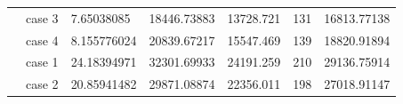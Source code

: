 \begin{table}[]
\begin{tabular}{cllllll}
    \rowcolor[HTML]{FFFFC7} 
    \cellcolor[HTML]{FFFFC7}                                                                                               & case 3                  & 7.65038085                                                                             & 18446.73883                                                                               & 13728.721                                                                           & 131                                                                        & 16813.77138                                                                                \\ \cline{2-7} 
    \rowcolor[HTML]{FFFFC7} 
    \multirow{-4}{*}{\cellcolor[HTML]{FFFFC7}2000}                                                                         & case 4                  & 8.155776024                                                                            & 20839.67217                                                                               & 15547.469                                                                           & 139                                                                        & 18820.91894                                                                                \\ \hline
    \rowcolor[HTML]{FFFFC7} 
    \cellcolor[HTML]{FFFFC7}                                                                                               & case 1                  & 24.18394971                                                                            & 32301.69933                                                                               & 24191.259                                                                           & 210                                                                        & 29136.75914                                                                                \\ \cline{2-7} 
    \rowcolor[HTML]{FFFFC7} 
    \cellcolor[HTML]{FFFFC7}                                                                                               & case 2                  & 20.85941482                                                                            & 29871.08874                                                                               & 22356.011                                                                           & 198                                                                        & 27018.91147                                                                                \\ \cline{2-7} 

\end{tabular}
\end{table}
